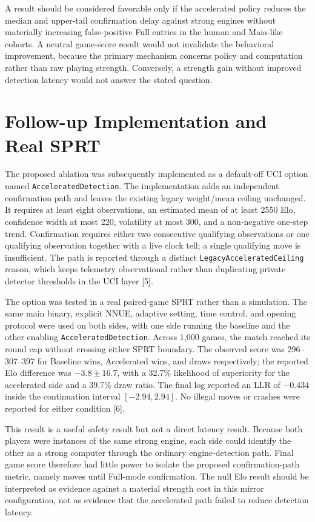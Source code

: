 \documentclass[conference]{IEEEtran}
\begin{document}
A result should be considered favorable only if the accelerated policy reduces the median and upper-tail confirmation delay against strong engines without materially increasing false-positive Full entries in the human and Maia-like cohorts. A neutral game-score result would not invalidate the behavioral improvement, because the primary mechanism concerns policy and computation rather than raw playing strength. Conversely, a strength gain without improved detection latency would not answer the stated question.

\section{Follow-up Implementation and Real SPRT}
The proposed ablation was subsequently implemented as a default-off UCI option named \texttt{AcceleratedDetection}. The implementation adds an independent confirmation path and leaves the existing legacy weight/mean ceiling unchanged. It requires at least eight observations, an estimated mean of at least 2550 Elo, confidence width at most 220, volatility at most 300, and a non-negative one-step trend. Confirmation requires either two consecutive qualifying observations or one qualifying observation together with a live clock tell; a single qualifying move is insufficient. The path is reported through a distinct \texttt{LegacyAcceleratedCeiling} reason, which keeps telemetry observational rather than duplicating private detector thresholds in the UCI layer [5].

The option was tested in a real paired-game SPRT rather than a simulation. The same main binary, explicit NNUE, adaptive setting, time control, and opening protocol were used on both sides, with one side running the baseline and the other enabling \texttt{AcceleratedDetection}. Across 1,000 games, the match reached its round cap without crossing either SPRT boundary. The observed score was 296--307--397 for Baseline wins, Accelerated wins, and draws respectively; the reported Elo difference was $-3.8\pm16.7$, with a 32.7\% likelihood of superiority for the accelerated side and a 39.7\% draw ratio. The final log reported an LLR of $-0.434$ inside the continuation interval $[-2.94,2.94]$. No illegal moves or crashes were reported for either condition [6].

This result is a useful safety result but not a direct latency result. Because both players were instances of the same strong engine, each side could identify the other as a strong computer through the ordinary engine-detection path. Final game score therefore had little power to isolate the proposed confirmation-path metric, namely moves until Full-mode confirmation. The null Elo result should be interpreted as evidence against a material strength cost in this mirror configuration, not as evidence that the accelerated path failed to reduce detection latency.
\end{document}
